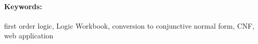 \documentclass[12pt, oneside]{book}  %
\begin{document}
\paragraph*{Keywords:} first order logic, Logic Workbook, conversion to conjunctive normal form, CNF, web application


%
%
%



\newpage 

\tableofcontents



\newpage 

\listoffigures


\mainmatter
\pagestyle{headings}


 

 

 


 

 


 





\newpage	

\backmatter

\thispagestyle{empty}
\clearpage


 






%
\end{document}
